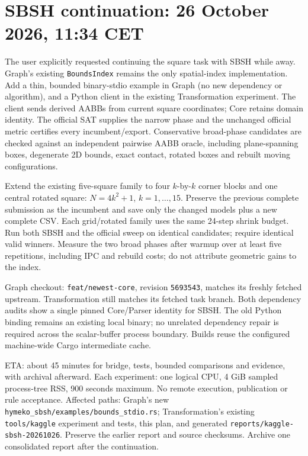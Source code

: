 \documentclass{article}
\begin{document}
\section*{SBSH continuation: 26 October 2026, 11:34 CET}
The user explicitly requested continuing the square task with SBSH while away.
Graph's existing \texttt{BoundsIndex} remains the only spatial-index implementation.
Add a thin, bounded binary-stdio example in Graph (no new dependency or algorithm),
and a Python client in the existing Transformation experiment. The client sends
derived AABBs from current square coordinates; Core retains domain identity.
The official SAT supplies the narrow phase and the unchanged official metric
certifies every incumbent/export. Conservative broad-phase candidates are checked
against an independent pairwise AABB oracle, including plane-spanning boxes,
degenerate 2D bounds, exact contact, rotated boxes and rebuilt moving configurations.

Extend the existing five-square family to four $k$-by-$k$ corner blocks and one
central rotated square: $N=4k^2+1$, $k=1,\ldots,15$. Preserve the previous complete
submission as the incumbent and save only the changed models plus a new complete
CSV. Each grid/rotated family uses the same 24-step shrink budget. Run both SBSH
and the official sweep on identical candidates; require identical valid winners.
Measure the two broad phases after warmup over at least five repetitions, including
IPC and rebuild costs; do not attribute geometric gains to the index.

Graph checkout: \texttt{feat/newest-core}, revision \texttt{5693543}, matches its
freshly fetched upstream. Transformation still matches its fetched task branch.
Both dependency audits show a single pinned Core/Parser identity for SBSH.
The old Python binding remains an existing local binary; no unrelated dependency
repair is required across the scalar-buffer process boundary.
Builds reuse the configured machine-wide Cargo intermediate cache.

ETA: about 45 minutes for bridge, tests, bounded comparisons and evidence, with
archival afterward. Each experiment: one logical CPU, 4 GiB sampled process-tree
RSS, 900 seconds maximum. No remote execution, publication or rule acceptance.
Affected paths: Graph's new \texttt{hymeko\_sbsh/examples/bounds\_stdio.rs};
Transformation's existing \texttt{tools/kaggle} experiment and tests, this plan,
and generated \texttt{reports/kaggle-sbsh-20261026}. Preserve the earlier report
and source checksums. Archive one consolidated report after the continuation.
\end{document}
